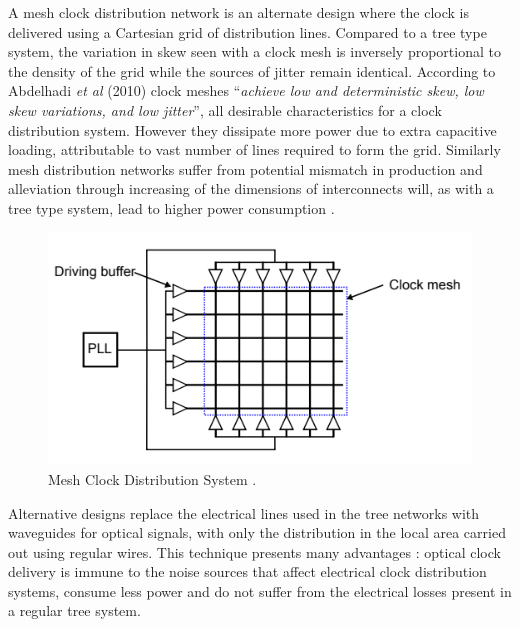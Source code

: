 A mesh clock distribution network is an alternate design where the clock is delivered using a Cartesian grid of distribution lines. Compared to a tree type system, the variation in skew seen with a clock mesh is inversely proportional to the density of the grid while the sources of jitter remain identical. According to Abdelhadi \textit{et al} (2010) clock meshes ``\textit{achieve low and deterministic skew, low skew variations, and low jitter}'', all desirable characteristics for a clock distribution system. However they dissipate more power due to extra capacitive loading, attributable to vast number of lines required to form the grid. Similarly mesh distribution networks suffer from potential mismatch in production and alleviation through increasing of the dimensions of interconnects will, as with a tree type system, lead to higher power consumption \cite{abdelhadi2010timing}. 
\begin{figure}[h]
	\centering
	\includegraphics[scale=0.7]{../tex_files/eldar_mesh}
	\caption{Mesh Clock Distribution System \cite{zianbetov2013phd}.}
	\label{fig:mesh}
\end{figure}
Alternative designs replace the electrical lines used in the tree networks with waveguides for optical signals, with only the distribution in the local area carried out using regular wires. This technique presents many advantages \cite{chen2006chip}: optical clock delivery is immune to the noise sources that affect electrical clock distribution systems, consume less power and do not suffer from the electrical losses present in a regular tree system.

